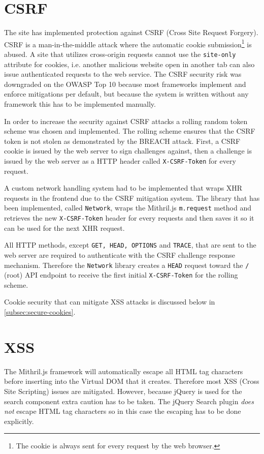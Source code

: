 \documentclass[12pt,a4paper]{report}
\begin{document}
\section{CSRF}
\label{subsec:csrf}
The site has implemented protection against CSRF (Cross Site Request Forgery). CSRF is a man-in-the-middle attack where the automatic cookie submission\footnote{The cookie is always sent for every request by the web browser.} is abused. A site that utilizes cross-origin requests cannot use the \texttt{site-only} attribute for cookies, i.e. another malicious website open in another tab can also issue authenticated requests to the web service\cite{rick}. The CSRF security risk was downgraded on the OWASP Top 10 because most frameworks implement and enforce mitigations per default\cite{owasp-top-10}, but because the system is written without any framework this has to be implemented manually.

In order to increase the security against CSRF attacks a rolling random token scheme was chosen and implemented. The rolling scheme ensures that the CSRF token is not stolen as demonstrated by the BREACH attack\cite{breach}. First, a CSRF cookie is issued by the web server to sign challenges against, then a challenge is issued by the web server as a HTTP header called \texttt{X-CSRF-Token} for every request.

A custom network handling system had to be implemented that wraps XHR requests in the frontend due to the CSRF mitigation system.  The library that has been implemented, called \texttt{Network}\cite{roaster-network}, wraps the Mithril.js \texttt{m.request} method and retrieves the new \texttt{X-CSRF-Token} header for every requests and then saves it so it can be used for the next XHR request.

All HTTP methods, except \texttt{GET, HEAD, OPTIONS} and \texttt{TRACE}, that are sent to the web server are required to authenticate with the CSRF challenge response mechanism. Therefore the \texttt{Network} library creates a \texttt{HEAD} request toward the \texttt{/} (root) API endpoint to receive the first initial \texttt{X-CSRF-Token} for the rolling scheme.

Cookie security that can mitigate XSS attacks is discussed below in \autoref{subsec:secure-cookies}.

\section{XSS}
The Mithril.js framework will automatically escape all HTML tag characters before inserting into the Virtual DOM that it creates\cite{mithril-trust}. Therefore most XSS (Cross Site Scripting) issues are mitigated. However, because jQuery is used for the search component extra caution has to be taken. The jQuery Search plugin \textit{does not} escape HTML tag characters so in this case the escaping has to be done explicitly.
\end{document}
